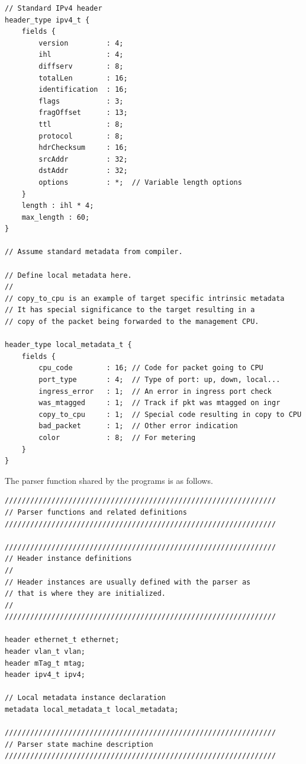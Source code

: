 \documentclass[12pt]{article}
\begin{document}
\begin{itemize}
\begin{lstlisting}[keywords={},frame=single,escapechar=\@]
// Standard IPv4 header
header_type ipv4_t {
    fields {
        version         : 4;
        ihl             : 4;
        diffserv        : 8;
        totalLen        : 16;
        identification  : 16;
        flags           : 3;
        fragOffset      : 13;
        ttl             : 8;
        protocol        : 8;
        hdrChecksum     : 16;
        srcAddr         : 32;
        dstAddr         : 32;
        options         : *;  // Variable length options
    }
    length : ihl * 4;
    max_length : 60;
}

// Assume standard metadata from compiler.

// Define local metadata here.
//
// copy_to_cpu is an example of target specific intrinsic metadata
// It has special significance to the target resulting in a
// copy of the packet being forwarded to the management CPU.

header_type local_metadata_t {
    fields {
        cpu_code        : 16; // Code for packet going to CPU
        port_type       : 4;  // Type of port: up, down, local...
        ingress_error   : 1;  // An error in ingress port check
        was_mtagged     : 1;  // Track if pkt was mtagged on ingr
        copy_to_cpu     : 1;  // Special code resulting in copy to CPU
        bad_packet      : 1;  // Other error indication
        color           : 8;  // For metering
    }
}
\end{lstlisting}

The parser function shared by the programs is as follows.

\begin{lstlisting}[keywords={},frame=single,escapechar=\@]
////////////////////////////////////////////////////////////////
// Parser functions and related definitions
////////////////////////////////////////////////////////////////

////////////////////////////////////////////////////////////////
// Header instance definitions
//
// Header instances are usually defined with the parser as
// that is where they are initialized.
//
////////////////////////////////////////////////////////////////

header ethernet_t ethernet;
header vlan_t vlan;
header mTag_t mtag;
header ipv4_t ipv4;

// Local metadata instance declaration
metadata local_metadata_t local_metadata;

////////////////////////////////////////////////////////////////
// Parser state machine description
////////////////////////////////////////////////////////////////


\end{lstlisting}
\end{itemize}
\end{document}
